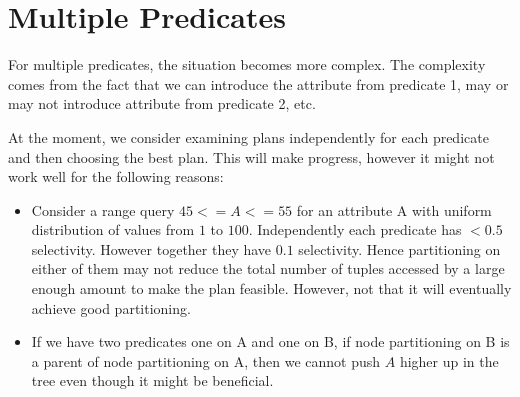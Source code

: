 \documentclass[18pt]{article}
\begin{document}
\section{Multiple Predicates}

For multiple predicates, the situation becomes more complex. The complexity comes from the fact that we can introduce the attribute from predicate 1, may or may not introduce attribute from predicate 2, etc. 

At the moment, we consider examining plans independently for each predicate and then choosing the best plan. This will make progress, however it might not work well for the following reasons:
\begin{itemize}
\item Consider a range query $45 <= A <= 55$ for an attribute A with uniform distribution of values from $1$ to $100$. Independently each predicate has $< 0.5$ selectivity. However together they have $0.1$ selectivity. Hence partitioning on either of them may not reduce the total number of tuples accessed by a large enough amount to make the plan feasible. However, not that it will eventually achieve good partitioning.
\item If we have two predicates one on A and one on B, if node partitioning on B is a parent of node partitioning on A, then we cannot push $A$ higher up in the tree even though it might be beneficial.
\end{itemize}
 
\end{document}
